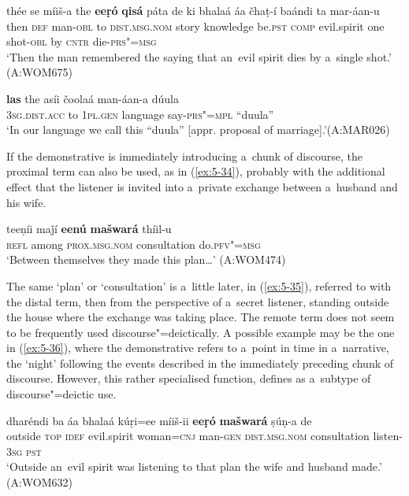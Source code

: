 \begin{exe}
\ex
\label{ex:5-32}
\gll thée se míiš-a the \textbf{eeṛó} \textbf{qisá} páta de ki bhalaá áa čhaṭ-í baándi ta mar-áan-u\\
then \textsc{def} man-\textsc{obl} to \textsc{dist.msg.nom} story knowledge be.\textsc{pst} \textsc{comp} evil.spirit one shot-\textsc{obl} by \textsc{cntr} die-\textsc{prs"=msg}\\
\glt `Then the man remembered the saying that an~evil spirit dies by a~single shot.' (A:WOM675)
\end{exe}
\begin{exe}
\ex
\label{ex:5-33}
\gll \textbf{las} the asíi čoolaá man-áan-a dúula\\
\textsc{3sg}.\textsc{dist.acc} to \textsc{1pl.gen} language say-\textsc{prs"=mpl} ``duula''\\
\glt `In our language we call this ``duula'' [appr. proposal of marriage].'\newline (A:MAR026)
\end{exe}
If the demonstrative is immediately introducing a~chunk of discourse, the proximal term can also be used, as in (\ref{ex:5-34}), probably with the additional effect that the listener is invited into a~private exchange between a~husband and his wife. 

\begin{exe}
\ex
\label{ex:5-34}
\gll teeṇíi maǰí \textbf{eenú} \textbf{mašwará} thíil-u \\
\textsc{refl} among \textsc{prox.msg.nom} consultation do.\textsc{pfv"=msg}\\
\glt `Between themselves they made this plan{\ldots}' (A:WOM474)
\end{exe}

The same `plan' or `consultation' is a~little later, in (\ref{ex:5-35}), referred to with the distal term, then from the perspective of a~secret listener, standing outside the house where the exchange was taking place. The remote term does not seem to be frequently used discourse"=deictically. A possible example may be the one in (\ref{ex:5-36}), where the demonstrative refers to a~point in time in a~narrative, the `night' following the events described in the immediately preceding chunk of discourse. However, this rather specialised function, \citet[225]{himmelmann1996} defines as a~subtype of discourse"=deictic use.

\ea\label{ex:5-35}
\gll dharéndi ba áa bhalaá kúṛi=ee míiš-ii \textbf{eeṛó} \textbf{mašwará} ṣúṇ-a de \\
outside \textsc{top} \textsc{idef} evil.spirit woman=\textsc{cnj} man-\textsc{gen} \textsc{dist.msg.nom} consultation listen-\textsc{3sg} \textsc{pst} \\
\glt `Outside an~evil spirit was listening to that plan the wife and husband made.' (A:WOM632)
\z

